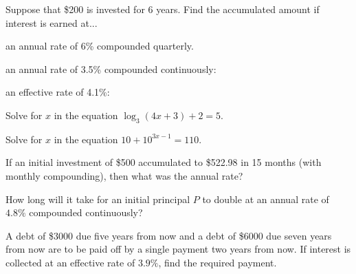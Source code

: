 \documentclass[11pt]{exam}
\begin{document}
\addpoints

\noindent
\begin{center}
\gradetable[v][pages]  %
\end{center}


\newpage %

%
%
%

\begin{questions}
\question[3] Suppose that \$200 is invested for $6$ years.  Find the accumulated amount if interest is earned at...
\begin{compactenum}[(a)]
\item an annual rate of 6\% compounded quarterly.
\vspace{7cm}

\item an annual rate of 3.5\% compounded continuously:
\vspace{7cm}

\item an effective rate of 4.1\%:
\end{compactenum}
\newpage

\question[3] Solve for $x$ in the equation $\log_3(4x+3)+2=5$.
\vspace{12cm}

\question[3] Solve for $x$ in the equation $10+10^{3x-1}=110$.
\newpage

\question[2] If an initial investment of \$500 accumulated to \$522.98 in 15 months (with monthly compounding), then what was the annual rate?
\vspace{10cm}

\question[2] How long will it take for an initial principal $P$ to double at an annual rate of $4.8\%$ compounded continuously?
\newpage

\question[3] A debt of \$3000 due five years from now and a debt of \$6000 due seven years from now are to be paid off by a single payment two years from now.  If interest is collected at an effective rate of $3.9\%$, find the required payment.
\newpage


\end{questions}
\end{document}
